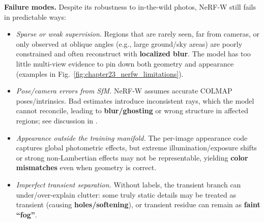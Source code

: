 \begin{enrichment}
\begin{enrichment}
        \textbf{Failure modes.}
        Despite its robustness to in-the-wild photos, NeRF-W still fails in predictable ways:
        \begin{itemize}[leftmargin=*,itemsep=0.25em]
            \item \emph{Sparse or weak supervision.} Regions that are rarely seen, far from cameras, or only observed at oblique angles (e.g., large ground/sky areas) are poorly constrained and often reconstruct with \textbf{localized blur}. The model has too little multi-view evidence to pin down both geometry and appearance (examples in Fig.~\ref{fig:chapter23_nerfw_limitations}).
            \item \emph{Pose/camera errors from SfM.} NeRF-W assumes accurate COLMAP poses/intrinsics. Bad estimates introduce inconsistent rays, which the model cannot reconcile, leading to \textbf{blur/ghosting} or wrong structure in affected regions; see discussion in \cite{martinbrualla2021_nerfw}.
            \item \emph{Appearance outside the training manifold.} The per-image appearance code captures global photometric effects, but extreme illumination/exposure shifts or strong non-Lambertian effects may not be representable, yielding \textbf{color mismatches} even when geometry is correct.
            \item \emph{Imperfect transient separation.} Without labels, the transient branch can under/over-explain clutter: some truly static details may be treated as transient (causing \textbf{holes/softening}), or transient residue can remain as \textbf{faint “fog”}.
        \end{itemize}
        
        \medskip
        

\end{enrichment}
\end{enrichment}
